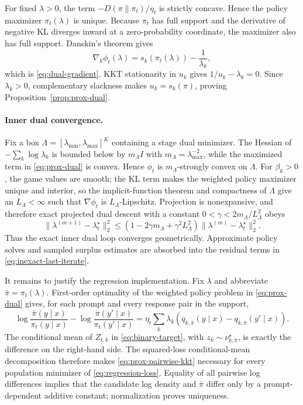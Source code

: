\documentclass{article}
\theoremstyle{remark}
\theoremstyle{plain}
\begin{document}
For fixed $\lambda>0$, the term $-D(\pi\|\pi_t)/\eta_t$ is strictly concave. Hence the policy maximizer $\pi_t(\lambda)$ is unique. Because $\pi_t$ has full support and the derivative of negative KL diverges inward at a zero-probability coordinate, the maximizer also has full support. Danskin's theorem gives
\[
\nabla_k\phi_t(\lambda)
=s_k(\pi_t(\lambda))-\frac1{\lambda_k},
\]
which is \eqref{eq:dual-gradient}. KKT stationarity in $u_k$ gives $1/u_k-\lambda_k=0$. Since $\lambda_k>0$, complementary slackness makes $u_k=s_k(\pi)$, proving Proposition~\ref{prop:prox-dual}.

\paragraph{Inner dual convergence.}
Fix a box $\Lambda=[\lambda_{\min},\lambda_{\max}]^K$ containing a stage dual minimizer. The Hessian of $-\sum_k\log\lambda_k$ is bounded below by $m_\Lambda I$ with $m_\Lambda=\lambda_{\max}^{-2}$, while the maximized term in \eqref{eq:prox-dual} is convex. Hence $\phi_t$ is $m_\Lambda$-strongly convex on $\Lambda$. For $\beta_k>0$, the game values are smooth; the KL term makes the weighted policy maximizer unique and interior, so the implicit-function theorem and compactness of $\Lambda$ give an $L_\Lambda<\infty$ such that $\nabla\phi_t$ is $L_\Lambda$-Lipschitz. Projection is nonexpansive, and therefore exact projected dual descent with a constant
$0<\gamma<2m_\Lambda/L_\Lambda^2$ obeys
\begin{equation}
\|\lambda^{(m+1)}-\lambda_t^\star\|_2^2
\le
\left(1-2\gamma m_\Lambda+\gamma^2L_\Lambda^2\right)
\|\lambda^{(m)}-\lambda_t^\star\|_2^2.
\label{eq:dual-linear-rate}
\end{equation}
Thus the exact inner dual loop converges geometrically. Approximate policy solves and sampled surplus estimates are absorbed into the residual terms in \eqref{eq:inexact-last-iterate}.

It remains to justify the regression implementation. Fix $\lambda$ and abbreviate $\bar\pi=\pi_t(\lambda)$. First-order optimality of the weighted policy problem in \eqref{eq:prox-dual} gives, for each prompt and every response pair in the support,
\begin{equation}
\log\frac{\bar\pi(y\mid x)}{\pi_t(y\mid x)}
-
\log\frac{\bar\pi(y'\mid x)}{\pi_t(y'\mid x)}
=
\eta_t\sum_k\lambda_k
\left(q_{k,\bar\pi}(y\mid x)-q_{k,\bar\pi}(y'\mid x)\right).
\label{eq:prox-pairwise-kkt}
\end{equation}
The conditional mean of $Z_{t,k}$ in \eqref{eq:binary-target}, with $z_k\sim\nu^\star_{k,\bar\pi}$, is exactly the difference on the right-hand side. The squared-loss conditional-mean decomposition therefore makes \eqref{eq:prox-pairwise-kkt} necessary for every population minimizer of \eqref{eq:regression-loss}. Equality of all pairwise log differences implies that the candidate log density and $\bar\pi$ differ only by a prompt-dependent additive constant; normalization proves uniqueness.
\end{document}
